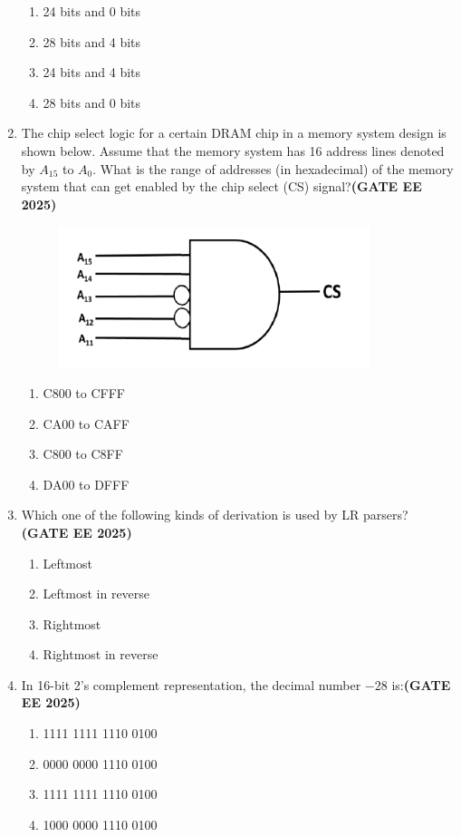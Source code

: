 \documentclass[journal,12pt,onecolumn]{IEEEtran}
\theoremstyle{remark}
\begin{document}
\begin{enumerate}
\begin{enumerate} 
\item 24 bits and 0 bits
\item 28 bits and 4 bits
\item 24 bits and 4 bits
\item 28 bits and 0 bits
\end{enumerate}

\item The chip select logic for a certain DRAM chip in a memory system design is shown below. Assume that the memory system has 16 address lines denoted by $A_{15}$ to $A_{0}$. What is the range of addresses (in hexadecimal) of the memory system that can get enabled by the chip select (CS) signal?\hfill \textbf{(GATE EE 2025)}
\begin{figure}[H]
    \centering
    \includegraphics[width=0.5\linewidth]{figs/fig3.png}
    \caption{ }
    \label{fig3}
\end{figure}
\begin{enumerate} 
\item C800 to CFFF
\item CA00 to CAFF
\item C800 to C8FF
\item DA00 to DFFF
\end{enumerate}

\item Which one of the following kinds of derivation is used by LR parsers?
\hfill \textbf{(GATE EE 2025)}
\begin{enumerate} 
\item Leftmost
\item Leftmost in reverse
\item Rightmost
\item Rightmost in reverse
\end{enumerate}

\item In 16-bit 2's complement representation, the decimal number $-28$ is:\hfill \textbf{(GATE EE 2025)}

\begin{enumerate} 
\item 1111 1111 1110 0100
\item 0000 0000 1110 0100
\item 1111 1111 1110 0100
\item 1000 0000 1110 0100
\end{enumerate}


\end{enumerate}
\end{document}
